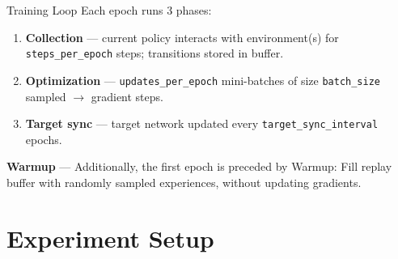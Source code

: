 \documentclass[aspectratio=169]{beamer}
\begin{document}
\begin{frame}{Training Loop}
  Each epoch runs 3 phases:

  \vspace{0.5em}
  \begin{enumerate}
    \item \textbf{Collection} — current policy interacts with environment(s) for \texttt{steps\_per\_epoch} steps; transitions stored in buffer.
    \vspace{0.3em}
    \item \textbf{Optimization} — \texttt{updates\_per\_epoch} mini-batches of size \texttt{batch\_size} sampled $\rightarrow$ gradient steps.
    \vspace{0.3em}
    \item \textbf{Target sync} — target network updated every \texttt{target\_sync\_interval} epochs.
  \end{enumerate}
  \vspace{1.0em}
  \textbf{Warmup} — Additionally, the first epoch is preceded by Warmup: Fill replay buffer with randomly sampled experiences, without updating gradients.

\end{frame}

\section{Experiment Setup}
\end{document}
